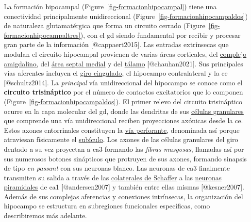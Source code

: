 \documentclass[
  11pt]{../MastersDoctoralThesisUNAM}
\begin{document}
La formación hipocampal (Figure~\ref{fig-formacionhipocampal}) tiene una
conectividad principalmente unidireccional
(Figure~\ref{fig-formacionhipocampaldos}) de naturaleza glutamatérgica
que forma un circuito cerrado
(Figure~\ref{fig-formacionhipocampaltres}), con el \ac{gd} siendo
fundamental por recibir y procesar gran parte de la información
{[}@cappaert2015{]}. Las entradas extrínsecas que modulan el circuito
hipocampal provienen de varias áreas corticales, del
\href{AppendixB.qmd\#term-id-13}{complejo amigdalino,}
del \href{AppendixB.qmd\#term-id-64}{área septal medial} y del
\href{AppendixB.qmd\#term-id-26}{tálamo} {[}@chauhan2021{]}. Sus
principales \colorbox{BurntOrange}{vías aferentes} incluyen el
\href{AppendixB.qmd\#term-id-65}{giro cingulado}, el hipocampo
contralateral y la \ac{ce} {[}@schultz2014{]}.
 La
\emph{principal} vía unidireccional del hipocampo se conoce como el
\textbf{circuito trisináptico} por el número de contactos excitatorios
que lo componen (Figure~\ref{fig-formacionhipocampaldos}). El primer
relevo del circuito trisináptico ocurre en la capa molecular del
\ac{gd}, donde las dendritas de sus
\href{AppendixB.qmd\#term-id-49}{células granulares} que comprende una
vía unidireccional reciben proyecciones axónicas desde la \ac{ce}. Estos
axones entorrinales constituyen la \href{AppendixB.qmd\#term-id-61}{vía
perforante}, denominada así porque atraviesan físicamente el
\href{AppendixB.qmd\#term-id-67}{subículo}. Los axones de las células
granulares del giro dentado a su vez proyectan a \ac{ca}3 formando las
\emph{fibras musgosas}, llamadas así por sus numerosos botones
sinápticos que protruyen de sus axones, formando sinapsis de tipo
\emph{en passant} con sus neuronas blanco. Las neuronas de \ac{ca}3
finalmente transmiten su salida a través de las
\href{AppendixB.qmd\#term-id-63}{colaterales de Schaffer} a las
\href{AppendixB.qmd\#term-id-48}{neuronas piramidales} de \ac{ca}1
{[}@andersen2007{]} y también entre ellas mismas {[}@kesner2007{]}.
Además de sus complejas aferencias y conexiones intrínsecas, la
organización del hipocampo se estructura en subregiones funcionales
específicas, como describiremos más adelante.
\end{document}
